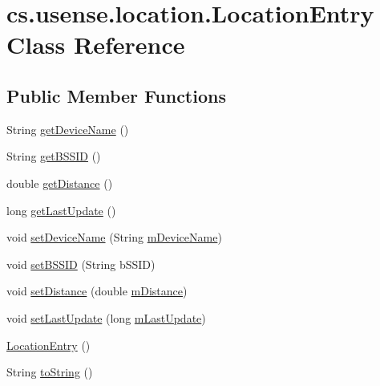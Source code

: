 \hypertarget{classcs_1_1usense_1_1location_1_1_location_entry}{}\section{cs.\+usense.\+location.\+Location\+Entry Class Reference}
\label{classcs_1_1usense_1_1location_1_1_location_entry}
\subsection*{Public Member Functions}
\begin{DoxyCompactItemize}
\item 
String \hyperlink{classcs_1_1usense_1_1location_1_1_location_entry_a663beb74738d455c35a3b0c15e72d543}{get\+Device\+Name} ()
\item 
String \hyperlink{classcs_1_1usense_1_1location_1_1_location_entry_a870e7bb228af3a099f7eb71352785979}{get\+B\+S\+S\+I\+D} ()
\item 
double \hyperlink{classcs_1_1usense_1_1location_1_1_location_entry_a572a0c1de978a9980acabc81534712ba}{get\+Distance} ()
\item 
long \hyperlink{classcs_1_1usense_1_1location_1_1_location_entry_a5a59c96c15c85183a8f15bfeed642c47}{get\+Last\+Update} ()
\item 
void \hyperlink{classcs_1_1usense_1_1location_1_1_location_entry_a1394b6384dcb67899651e9bb9112e95e}{set\+Device\+Name} (String \hyperlink{classcs_1_1usense_1_1location_1_1_location_entry_a5635a875425bd75e79e3bb0c986ea387}{m\+Device\+Name})
\item 
void \hyperlink{classcs_1_1usense_1_1location_1_1_location_entry_ab6f6c3998b5ae8906d616ee99b40c330}{set\+B\+S\+S\+I\+D} (String b\+S\+S\+I\+D)
\item 
void \hyperlink{classcs_1_1usense_1_1location_1_1_location_entry_a2c5a77db026defac48768ecb7149b298}{set\+Distance} (double \hyperlink{classcs_1_1usense_1_1location_1_1_location_entry_aec160f380f13be547cc37a7eb4b1f8f2}{m\+Distance})
\item 
void \hyperlink{classcs_1_1usense_1_1location_1_1_location_entry_a509cd2c7c9d091f301a8f6fdf0384677}{set\+Last\+Update} (long \hyperlink{classcs_1_1usense_1_1location_1_1_location_entry_a77f985e5085d7440066c966de2d7c794}{m\+Last\+Update})
\item 
\hyperlink{classcs_1_1usense_1_1location_1_1_location_entry_a57e636b721f573793f637779ed09cc8e}{Location\+Entry} ()
\item 
String \hyperlink{classcs_1_1usense_1_1location_1_1_location_entry_aa3a8fc7d412841133db33bd0b97aefb2}{to\+String} ()
\end{DoxyCompactItemize}
